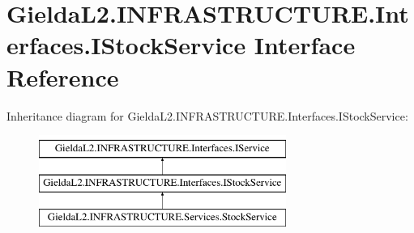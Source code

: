 \hypertarget{interface_gielda_l2_1_1_i_n_f_r_a_s_t_r_u_c_t_u_r_e_1_1_interfaces_1_1_i_stock_service}{}\section{Gielda\+L2.\+I\+N\+F\+R\+A\+S\+T\+R\+U\+C\+T\+U\+R\+E.\+Interfaces.\+I\+Stock\+Service Interface Reference}
\label{interface_gielda_l2_1_1_i_n_f_r_a_s_t_r_u_c_t_u_r_e_1_1_interfaces_1_1_i_stock_service}
Inheritance diagram for Gielda\+L2.\+I\+N\+F\+R\+A\+S\+T\+R\+U\+C\+T\+U\+R\+E.\+Interfaces.\+I\+Stock\+Service\+:\begin{figure}[H]
\begin{center}
\leavevmode
\includegraphics[height=3.000000cm]{interface_gielda_l2_1_1_i_n_f_r_a_s_t_r_u_c_t_u_r_e_1_1_interfaces_1_1_i_stock_service}
\end{center}
\end{figure}

